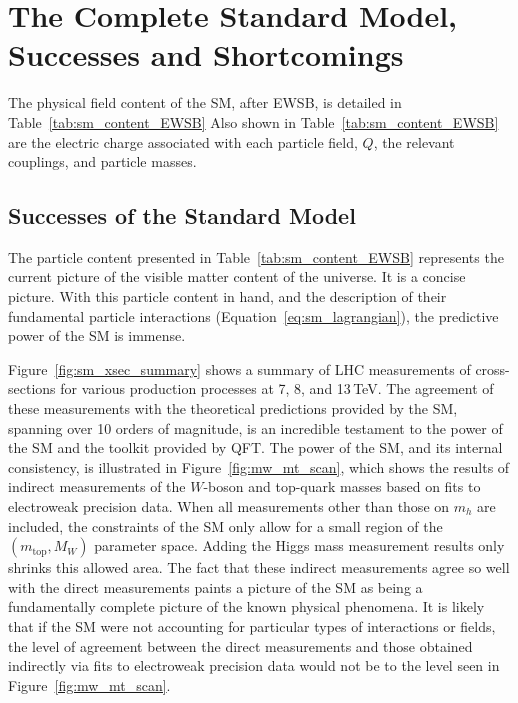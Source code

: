 \section{The Complete Standard Model, Successes and Shortcomings}
\label{sec:final_sm_description}

The physical field content of the SM, after EWSB, is detailed in Table~\ref{tab:sm_content_EWSB}
Also shown in Table~\ref{tab:sm_content_EWSB} are the electric charge associated with each
particle field, $Q$, the relevant couplings, and particle masses.



%
%

\subsection{Successes of the Standard Model}
\label{sec:sm_successes}

The particle content presented in Table~\ref{tab:sm_content_EWSB} represents the current
picture of the visible matter content of the universe.
It is a concise picture.
With this particle content in hand, and the description of their fundamental particle interactions (Equation~\ref{eq:sm_lagrangian}),
the predictive power of the SM is immense.

Figure~\ref{fig:sm_xsec_summary} shows a summary of LHC measurements of cross-sections
for various production processes at 7, 8, and 13\,TeV.
The agreement of these measurements with the theoretical predictions provided by the SM, spanning over 10 orders of magnitude,
is an incredible testament to the power of the SM and the toolkit provided by QFT.
The power of the SM, and its internal consistency, is illustrated in Figure~\ref{fig:mw_mt_scan},
which shows the results of indirect measurements of the $W$-boson and top-quark masses based
on fits to electroweak precision data.
When all measurements other than those on $m_h$ are included, the constraints of the SM
only allow for a small region of the $(m_{\text{top}}, M_W)$ parameter space.
Adding the Higgs mass measurement results only shrinks this allowed area.
The fact that these indirect measurements agree so well with the direct measurements paints a picture
of the SM as being a fundamentally complete picture of the known physical phenomena.
It is likely that if the SM were not accounting for particular types of interactions or fields,
the level of agreement between the direct measurements and those obtained indirectly via
fits to electroweak precision data would not be to the level seen in Figure~\ref{fig:mw_mt_scan}.

